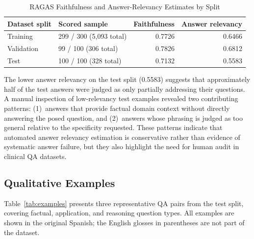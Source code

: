 \documentclass[conference]{IEEEtran}
\begin{document}
\begin{table}[t]
\caption{RAGAS Faithfulness and Answer-Relevancy Estimates by Split}
\label{tab:ragas}
\centering
\scriptsize
\setlength{\tabcolsep}{2pt}
\begin{tabular}{|p{}|p{}|r|r|}
\hline
\textbf{Dataset split} & \textbf{Scored sample} & \textbf{Faithfulness} & \textbf{Answer relevancy} \\
\hline
Training & 299 / 300 (5,093 total) & 0.7726 & 0.6466 \\
Validation & 99 / 100 (306 total) & 0.7826 & 0.6812 \\
Test & 100 / 100 (328 total) & 0.7132 & 0.5583 \\
\hline
\end{tabular}
\end{table}

The lower answer relevancy on the test split (0.5583) suggests that approximately half of the test answers were judged as only partially addressing their questions. A manual inspection of low-relevancy test examples revealed two contributing patterns: (1)~answers that provide factual domain context without directly answering the posed question, and (2)~answers whose phrasing is judged as too general relative to the specificity requested. These patterns indicate that automated answer relevancy estimation is conservative rather than evidence of systematic answer failure, but they also highlight the need for human audit in clinical QA datasets.

\subsection{Qualitative Examples}

Table~\ref{tab:examples} presents three representative QA pairs from the test split, covering factual, application, and reasoning question types. All examples are shown in the original Spanish; the English glosses in parentheses are not part of the dataset.
\end{document}
